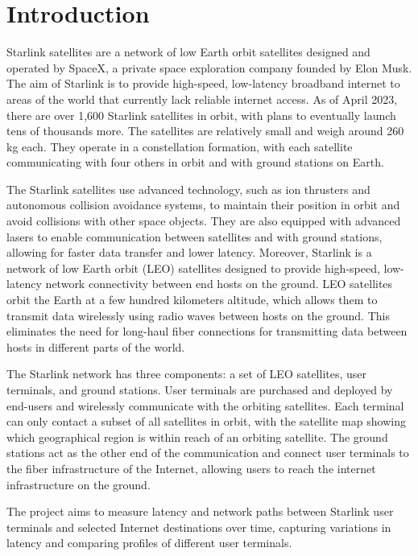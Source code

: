 \documentclass[acmsmall]{acmart}
\begin{document}
\section{Introduction}
Starlink satellites are a network of low Earth orbit satellites designed and operated by SpaceX, a private space exploration company founded by Elon Musk. The aim of Starlink is to provide high-speed, low-latency broadband internet to areas of the world that currently lack reliable internet access. As of April 2023, there are over 1,600 Starlink satellites in orbit, with plans to eventually launch tens of thousands more. The satellites are relatively small and weigh around 260 kg each. They operate in a constellation formation, with each satellite communicating with four others in orbit and with ground stations on Earth.

The Starlink satellites use advanced technology, such as ion thrusters and autonomous collision avoidance systems, to maintain their position in orbit and avoid collisions with other space objects. They are also equipped with advanced lasers to enable communication between satellites and with ground stations, allowing for faster data transfer and lower latency. Moreover, Starlink is a network of low Earth orbit (LEO) satellites designed to provide high-speed, low-latency network connectivity between end hosts on the ground. LEO satellites orbit the Earth at a few hundred kilometers altitude, which allows them to transmit data wirelessly using radio waves between hosts on the ground. This eliminates the need for long-haul fiber connections for transmitting data between hosts in different parts of the world.

The Starlink network has three components: a set of LEO satellites, user terminals, and ground stations. User terminals are purchased and deployed by end-users and wirelessly communicate with the orbiting satellites. Each terminal can only contact a subset of all satellites in orbit, with the satellite map showing which geographical region is within reach of an orbiting satellite. The ground stations act as the other end of the communication and connect user terminals to the fiber infrastructure of the Internet, allowing users to reach the internet infrastructure on the ground.

The project aims to measure latency and network paths between Starlink user terminals and selected Internet destinations over time, capturing variations in latency and comparing profiles of different user terminals.
\end{document}
